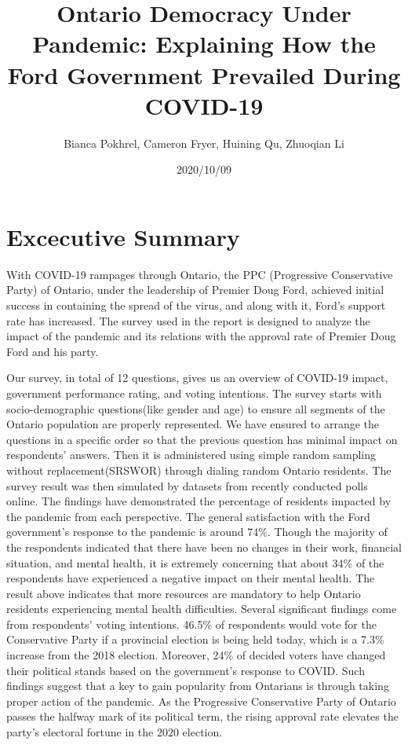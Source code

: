 \documentclass[
]{article}
\title{Ontario Democracy Under Pandemic: Explaining How the Ford Government
Prevailed During COVID-19}
\author{Bianca Pokhrel, Cameron Fryer, Huining Qu, Zhuoqian Li}
\date{2020/10/09}
\begin{document}
\maketitle

\hypertarget{excecutive-summary}{%
\section{Excecutive Summary}\label{excecutive-summary}}

With COVID-19 rampages through Ontario, the PPC (Progressive
Conservative Party) of Ontario, under the leadership of Premier Doug
Ford, achieved initial success in containing the spread of the virus,
and along with it, Ford's support rate has increased. The survey used in
the report is designed to analyze the impact of the pandemic and its
relations with the approval rate of Premier Doug Ford and his party.

Our survey, in total of 12 questions, gives us an overview of COVID-19
impact, government performance rating, and voting intentions. The survey
starts with socio-demographic questions(like gender and age) to ensure
all segments of the Ontario population are properly represented. We have
ensured to arrange the questions in a specific order so that the
previous question has minimal impact on respondents' answers. Then it is
administered using simple random sampling without replacement(SRSWOR)
through dialing random Ontario residents. The survey result was then
simulated by datasets from recently conducted polls online. The findings
have demonstrated the percentage of residents impacted by the pandemic
from each perspective. The general satisfaction with the Ford
government's response to the pandemic is around 74\%. Though the
majority of the respondents indicated that there have been no changes in
their work, financial situation, and mental health, it is extremely
concerning that about 34\% of the respondents have experienced a
negative impact on their mental health. The result above indicates that
more resources are mandatory to help Ontario residents experiencing
mental health difficulties. Several significant findings come from
respondents' voting intentions. 46.5\% of respondents would vote for the
Conservative Party if a provincial election is being held today, which
is a 7.3\% increase from the 2018 election. Moreover, 24\% of decided
voters have changed their political stands based on the government's
response to COVID. Such findings suggest that a key to gain popularity
from Ontarians is through taking proper action of the pandemic. As the
Progressive Conservative Party of Ontario passes the halfway mark of its
political term, the rising approval rate elevates the party's electoral
fortune in the 2020 election.
\end{document}
